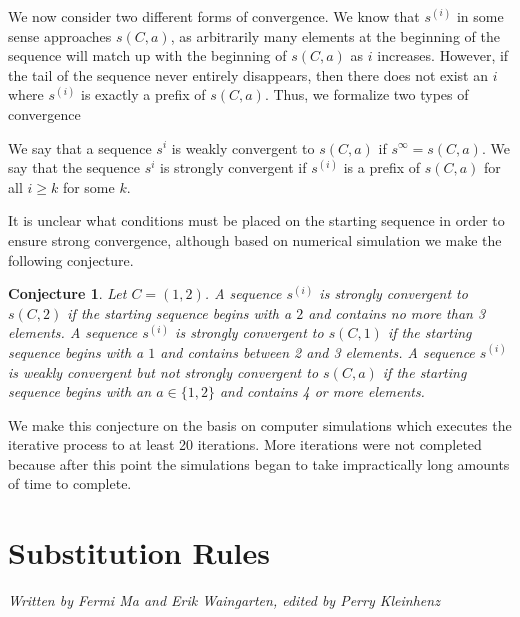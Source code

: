 \documentclass[runningheads,a4paper]{llncs}
\newtheorem{conj}[theorem]{Conjecture}
\begin{document}
We now consider two different forms of convergence. We know that $s^{(i)}$ in some sense approaches $s(C,a)$, as arbitrarily many elements at the beginning of the sequence will match up with the beginning of $s(C,a)$ as $i$ increases. However, if the tail of the sequence never entirely disappears, then there does not exist an $i$ where $s^{(i)}$ is exactly a prefix of $s(C,a)$. Thus, we formalize two types of convergence
\begin{definition} We say that a sequence $s^{i}$ is weakly convergent to $s(C,a)$ if $s^\infty = s(C,a)$. We say that the sequence $s^{i}$ is strongly convergent if $s^{(i)}$ is a prefix of $s(C,a)$ for all $i \geq k$ for some $k$.
\end{definition}
It is unclear what conditions must be placed on the starting sequence in order to ensure strong convergence, although based on numerical simulation we make the following conjecture. 

\begin{conj} Let $C = (1,2)$. A sequence $s^{(i)}$ is strongly convergent to $s(C, 2)$ if the starting sequence begins with a $2$ and contains no more than 3 elements. A sequence $s^{(i)}$ is strongly convergent to $s(C, 1)$ if the starting sequence begins with a $1$ and contains between 2 and 3 elements. A sequence $s^{(i)}$ is weakly convergent but not strongly convergent to $s(C, a)$ if the starting sequence begins with an $a \in \{1,2\}$ and contains 4 or more elements.
\end{conj} 
We make this conjecture on the basis on computer simulations which executes the iterative process to at least 20 iterations. More iterations were not completed because after this point the simulations began to take impractically long amounts of time to complete. 

\section{Substitution Rules}
\label{substitutionrules}

\emph{Written by Fermi Ma and Erik Waingarten, edited by Perry Kleinhenz}
\end{document}
